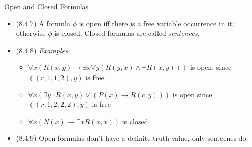 \begin{frame}{Open and Closed Formulas}

	\begin{itemize}
	
		\item (8.4.7) A formula $\phi$ is open iff there is a free variable occurrence in it; otherwise $\phi$ is closed. Closed formulas are called \emph{sentences}.
		
		\item (8.4.8) \emph{Examples}:
		
		\begin{itemize}
			
				\item $\forall x(R(x,y)\to \exists x\forall y(R(y,x)\land \neg R(x,y)))$ is open, since $((r,1,1,2),y)$ is free.

			
				\item $\forall x(\exists y \neg R(x,y)\lor (P(x)\to R(c,y)))$ is open since $( ( r,1,2,2,2), y)$ is free
				
				\item $\forall x({N}(x)\to {\exists x}R(x,x))$ is closed.
			
			\end{itemize}
			
		
		\item (8.4.9) Open formulas don't have a definite truth-value, only sentcenes do.
		
		
	\end{itemize}

\end{frame}
